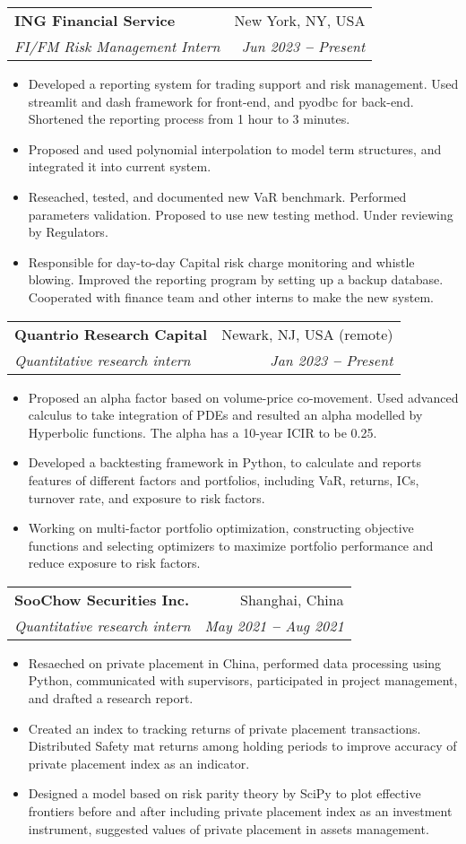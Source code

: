 \documentclass[a4paper,11pt]{article}
\makeatletter
\newcommand{\resumeItem}[1]{
  \item\small{
    {#1 \vspace{-2pt}}
  }
}
\newcommand{\resumeSubheading}[4]{
  \vspace{-2pt}\item
    \begin{tabular*}{0.97\textwidth}[t]{l@{\extracolsep{\fill}}r}
      \textbf{#1} & #2 \\
      \textit{\small#3} & \textit{\small #4} \\
    \end{tabular*}\vspace{-7pt}
}
\newcommand{\resumeItemListStart}{\begin{itemize}}
\newcommand{\resumeItemListEnd}{\end{itemize}\vspace{-5pt}}
\makeatother
\begin{document}
    \resumeSubheading
      {ING Financial Service}{New York, NY, USA}
      {FI/FM Risk Management Intern}{Jun 2023 \textbf{--} Present}
        \resumeItemListStart
            \resumeItem{Developed a reporting system for trading support and risk management. Used streamlit and dash framework for front-end, and pyodbc for back-end. Shortened the reporting process from 1 hour to 3 minutes.}
            \resumeItem{Proposed and used polynomial interpolation to model term structures, and integrated it into current system.}
            \resumeItem{Reseached, tested, and documented new VaR benchmark. Performed parameters validation. Proposed to use new testing method. Under reviewing by Regulators.}
            \resumeItem{Responsible for day-to-day Capital risk charge monitoring and whistle blowing. Improved the reporting program by setting up a backup database. Cooperated with finance team and other interns to make the new system. }
            
        \resumeItemListEnd
    
    \resumeSubheading
      {Quantrio Research Capital}{Newark, NJ, USA (remote)}
      {Quantitative research intern}{Jan 2023 \textbf{--} Present}
        \resumeItemListStart
            \resumeItem{Proposed an alpha factor based on volume-price co-movement. Used advanced calculus to take integration of PDEs and resulted an alpha modelled by Hyperbolic functions. The alpha has a 10-year ICIR to be 0.25.}
            \resumeItem{Developed a backtesting framework in Python, to calculate and reports features of different factors and portfolios, including VaR, returns, ICs, turnover rate, and exposure to risk factors.}
            \resumeItem{Working on multi-factor portfolio optimization, constructing objective functions and selecting optimizers to maximize portfolio performance and reduce exposure to risk factors.}
        \resumeItemListEnd
    
    \resumeSubheading
      {SooChow Securities Inc. }{Shanghai, China}
      {Quantitative research intern}{May 2021 \textbf{--} Aug 2021}
      
        \resumeItemListStart
            \resumeItem{Resaeched on private placement in China, performed data processing using Python, communicated with supervisors, participated in project management, and drafted a research report.}
            \resumeItem{Created an index to tracking returns of private placement transactions. Distributed Safety mat returns among holding periods to improve accuracy of private placement index as an indicator.}
            \resumeItem{Designed a model based on risk parity theory by SciPy to plot effective frontiers before and after including private placement index as an investment instrument, suggested values of private placement in assets management.}
        \resumeItemListEnd
    
\end{document}
